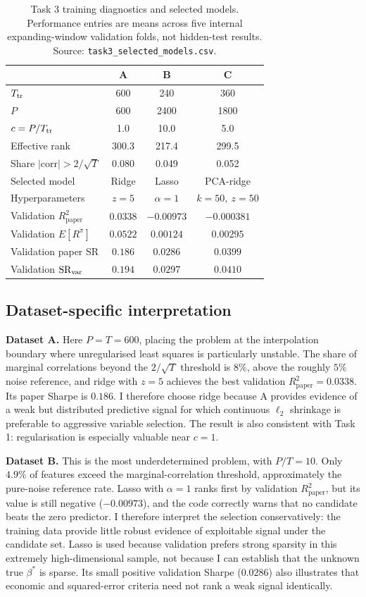 \documentclass[11pt,a4paper]{article}
\newcommand{\Rpaper}{R^2_{\mathrm{paper}}}
\newcommand{\SR}{\mathrm{SR}}
\begin{document}
\begin{table}[h]\centering\small
\begin{tabular}{@{}l ccc@{}}\toprule
 & A & B & C\\\midrule
$T_{\rm tr}$ & 600 & 240 & 360\\
$P$ & 600 & 2400 & 1800\\
$c=P/T_{\rm tr}$ & 1.0 & 10.0 & 5.0\\
Effective rank & 300.3 & 217.4 & 299.5\\
Share $|\mathrm{corr}|>2/\sqrt{T}$ & 0.080 & 0.049 & 0.052\\
Selected model & Ridge & Lasso & PCA-ridge\\
Hyperparameters & $z=5$ & $\alpha=1$ & $k=50,\ z=50$\\
Validation $\Rpaper$ & $0.0338$ & $-0.00973$ & $-0.000381$\\
Validation $E[R^\pi]$ & $0.0522$ & $0.00124$ & $0.00295$\\
Validation paper SR & $0.186$ & $0.0286$ & $0.0399$\\
Validation $\SR_{\rm var}$ & $0.194$ & $0.0297$ & $0.0410$\\\bottomrule
\end{tabular}
\caption[Task 3 training diagnostics and selected models]{Task 3 training diagnostics and selected models. Performance entries are means across five internal expanding-window validation folds, not hidden-test results. Source: \texttt{task3\_selected\_models.csv}.}\label{tab:t3}
\end{table}

\subsection{Dataset-specific interpretation}
\textbf{Dataset A.} Here $P=T=600$, placing the problem at the interpolation boundary where unregularised least squares is particularly unstable. The share of marginal correlations beyond the $2/\sqrt{T}$ threshold is $8\%$, above the roughly $5\%$ noise reference, and ridge with $z=5$ achieves the best validation $\Rpaper=0.0338$. Its paper Sharpe is $0.186$. I therefore choose ridge because A provides evidence of a weak but distributed predictive signal for which continuous $\ell_2$ shrinkage is preferable to aggressive variable selection. The result is also consistent with Task 1: regularisation is especially valuable near $c=1$.

\textbf{Dataset B.} This is the most underdetermined problem, with $P/T=10$. Only $4.9\%$ of features exceed the marginal-correlation threshold, approximately the pure-noise reference rate. Lasso with $\alpha=1$ ranks first by validation $\Rpaper$, but its value is still negative ($-0.00973$), and the code correctly warns that no candidate beats the zero predictor. I therefore interpret the selection conservatively: the training data provide little robust evidence of exploitable signal under the candidate set. Lasso is used because validation prefers strong sparsity in this extremely high-dimensional sample, not because I can establish that the unknown true $\beta^*$ is sparse. Its small positive validation Sharpe ($0.0286$) also illustrates that economic and squared-error criteria need not rank a weak signal identically.
\end{document}
